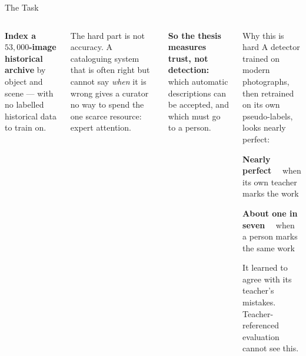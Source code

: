 \documentclass[aspectratio=169,11pt]{beamer}
\begin{document}
\begin{frame}{The Task}
\begin{columns}[T]
\small
\textbf{Index a $53{,}000$-image historical archive} by object and scene --- with no labelled historical data to train on.
\vspace{2mm}

The hard part is not accuracy. A cataloguing system that is often right but cannot say \emph{when} it is wrong gives a curator no way to spend the one scarce resource: expert attention.
\vspace{2mm}

\textbf{So the thesis measures trust, not detection:} which automatic descriptions can be accepted, and which must go to a person.

\begin{block}{\small Why this is hard}
\footnotesize A detector trained on modern photographs, then retrained on its own pseudo-labels, looks nearly perfect:
\vspace{1mm}
\begin{center}
\textbf{Nearly perfect} \ \ when its own teacher marks the work
\vspace{1mm}

\textbf{About one in seven} \ \ when a person marks the same work
\end{center}
\vspace{1mm}
It learned to agree with its teacher's mistakes. Teacher-referenced evaluation cannot see this.
\end{block}
\end{columns}
\end{frame}
\end{document}
